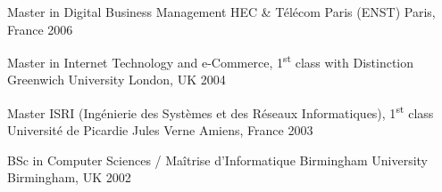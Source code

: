 

\begin{cventries}

  \cventry
    {Master in Digital Business Management} %
    {\hspace{0.5em}HEC \& Télécom Paris (ENST)} %
    {Paris, France} %
    {2006} %
    {}
    {}

  \cventry
    {Master in Internet Technology and e-Commerce, 1\textsuperscript{st} class with Distinction} %
    {\hspace{0.5em}Greenwich University} %
    {London, UK} %
    {2004} %
    {}
    {}

  \cventry
    {Master ISRI (Ingénierie des Systèmes et des Réseaux Informatiques), 1\textsuperscript{st} class} %
    {\hspace{0.5em}Université de Picardie Jules Verne} %
    {Amiens, France} %
    {2003} %
    {}
    {}

  \cventry
    {BSc in Computer Sciences / Maîtrise d'Informatique} %
    {\hspace{0.5em}Birmingham University} %
    {Birmingham, UK} %
    {2002} %
    {}
    {}
\end{cventries}
